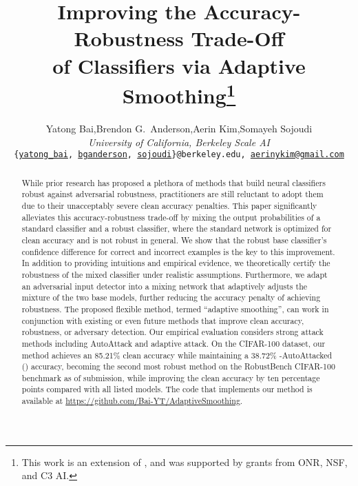 \documentclass[11pt, letterpaper]{article}
\theoremstyle{plain}
\theoremstyle{definition}
\begin{document}
\title{Improving the Accuracy-Robustness Trade-Off\\of Classifiers via Adaptive Smoothing\thanks{This work is an extension of \citep{Bai23a}, and was supported by grants from ONR, NSF, and C3 AI.}}

\author{
Yatong Bai,Brendon G.\ Anderson,Aerin Kim,Somayeh Sojoudi\\
\textit{University of California, Berkeley Scale AI}\\
{\tt\small \{\href{mailto:<yatong_bai@berkeley.edu>?Subject=Your 2023 paper}{yatong\_bai}{}, \href{mailto:<bganderson@berkeley.edu>?Subject=Your 2023 paper}{bganderson}{}, \href{mailto:<sojoudi@berkeley.edu>?Subject=Your 2023 paper}{sojoudi}{}\}@berkeley.edu,  \tt\small \href{mailto:aerinykim@gmail.com>?Subject=Your 2023 paper}{aerinykim@gmail.com}{}}
}

\maketitle


\begin{abstract}
While prior research has proposed a plethora of methods that build neural classifiers robust against adversarial robustness, practitioners are still reluctant to adopt them due to their unacceptably severe clean accuracy penalties.
This paper significantly alleviates this accuracy-robustness trade-off by mixing the output probabilities of a standard classifier and a robust classifier, where the standard network is optimized for clean accuracy and is not robust in general.
We show that the robust base classifier's confidence difference for correct and incorrect examples is the key to this improvement.
In addition to providing intuitions and empirical evidence, we theoretically certify the robustness of the mixed classifier under realistic assumptions. 
Furthermore, we adapt an adversarial input detector into a mixing network that adaptively adjusts the mixture of the two base models, further reducing the accuracy penalty of achieving robustness.
The proposed flexible method, termed ``adaptive smoothing'', can work in conjunction with existing or even future methods that improve clean accuracy, robustness, or adversary detection.
Our empirical evaluation considers strong attack methods including AutoAttack and adaptive attack. On the CIFAR-100 dataset, our method achieves an 85.21\% clean accuracy while maintaining a 38.72\% -AutoAttacked () accuracy, becoming the second most robust method on the RobustBench CIFAR-100 benchmark as of submission, while improving the clean accuracy by ten percentage points compared with all listed models.
The code that implements our method is available at \url{https://github.com/Bai-YT/AdaptiveSmoothing}.
\end{abstract}
\end{document}
